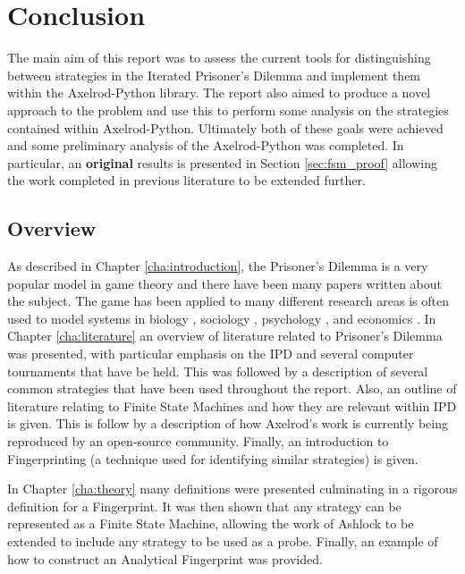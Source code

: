 
\chapter{Conclusion}\label{cha:conclusion}

The main aim of this report was to assess the current tools for distinguishing between strategies in the Iterated Prisoner's Dilemma and implement them within the Axelrod-Python library.
The report also aimed to produce a novel approach to the problem and use this to perform some analysis on the strategies contained within Axelrod-Python.
Ultimately both of these goals were achieved and some preliminary analysis of the Axelrod-Python was completed.
In particular, an \textbf{original} results is presented in Section \ref{sec:fsm_proof} allowing the work completed in previous literature to be extended further.


\section{Overview}

As described in Chapter \ref{cha:introduction}, the Prisoner's Dilemma is a very popular model in game theory and there have been many papers written about the subject.
The game has been applied to many different research areas is often used to model systems in biology \cite{Sigmund1999}, sociology \cite{Franken2005}, psychology \cite{Ishibuchi2005}, and economics \cite{Chong2005}.
In Chapter \ref{cha:literature} an overview of literature related to Prisoner's Dilemma was presented, with particular emphasis on the IPD and several computer tournaments that have be held.
This was followed by a description of several common strategies that have been used throughout the report.
Also, an outline of literature relating to Finite State Machines and how they are relevant within IPD is given.
This is follow by a description of how Axelrod's work is currently being reproduced by an open-source community.
Finally, an introduction to Fingerprinting (a technique used for identifying similar strategies) is given.

In Chapter \ref{cha:theory} many definitions were presented culminating in a rigorous definition for a Fingerprint.
It was then shown that any strategy can be represented as a Finite State Machine, allowing the work of Ashlock to be extended to include any strategy to be used as a probe.
Finally, an example of how to construct an Analytical Fingerprint was provided.

